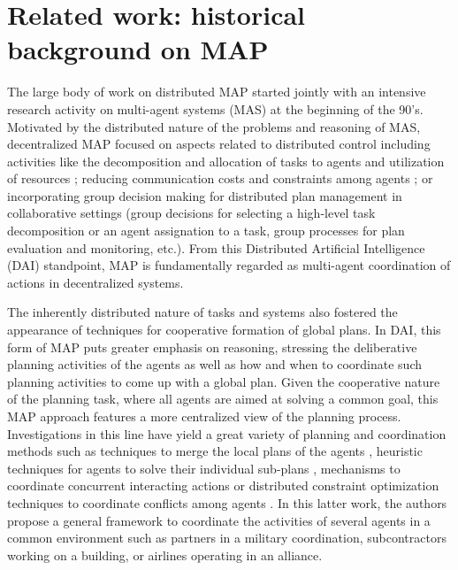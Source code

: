 \documentclass[12pt]{article}
\begin{document}
\section{Related work: historical background on MAP}

The large body of work on distributed MAP started jointly with an intensive research activity on multi-agent systems (MAS) at the beginning of the 90’s.
Motivated by the distributed nature of the problems and reasoning of MAS, decentralized MAP focused on aspects related to distributed control including activities like the decomposition and allocation of tasks to agents and utilization of resources \cite{120067}\cite{10.5555/3090522.3090546}; reducing communication costs and constraints among agents \cite{decker_lesser_1992}\cite{Wolverton1998ControllingCI}; or incorporating group decision making for distributed plan management in collaborative settings (group decisions for selecting a high-level task decomposition or an agent assignation to a task, group processes for plan evaluation and monitoring, etc.)\cite{Grosz1999PlanningAA}.
From this Distributed Artificial Intelligence (DAI) standpoint, MAP is fundamentally regarded as multi-agent coordination of actions in decentralized systems.

The inherently distributed nature of tasks and systems also fostered the appearance of techniques for cooperative formation of global plans.
In DAI, this form of MAP puts greater emphasis on reasoning, stressing the deliberative planning activities of the agents as well as how and when to coordinate such planning activities to come up with a global plan.
Given the cooperative nature of the planning task, where all agents are aimed at solving a common goal, this MAP approach features a more centralized view of the planning process.
Investigations in this line have yield a great variety of planning and coordination methods such as techniques to merge the local plans of the agents \cite{Ephrati1994DivideAC}\cite{desJardins1999CoordinatingAD}\cite{1373700}, heuristic techniques for agents to solve their individual sub-plans \cite{Ephrati1997AHT}, mechanisms to coordinate concurrent interacting actions \cite{Boutilier_2001} or distributed constraint optimization techniques to coordinate conflicts among agents \cite{1373700}.
In this latter work, the authors propose a general framework to coordinate the activities of several agents in a common environment such as partners in a military coordination, subcontractors working on a building, or airlines operating in an alliance.
\end{document}
